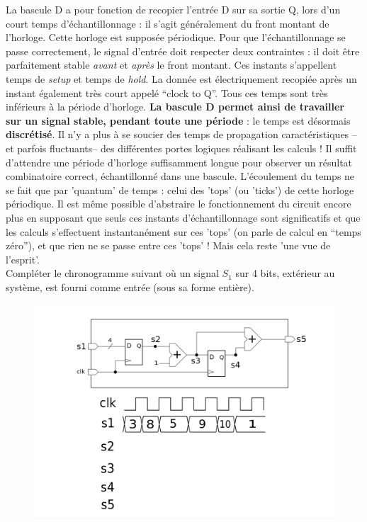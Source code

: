 \documentclass[a4paper,11pt]{article}
\begin{document}
La bascule D a pour fonction de recopier l'entrée D sur sa sortie Q, lors d'un court temps d'échantillonnage : il s'agit généralement du front montant de l'horloge. Cette horloge est supposée périodique. Pour que l'échantillonnage se passe correctement, le signal d'entrée doit respecter deux contraintes : il doit être parfaitement stable {\it avant} et {\it après} le front montant. Ces instants s'appellent temps de {\it setup} et temps de {\it hold}. La donnée est électriquement recopiée après un instant également très court appelé ``clock to Q''. Tous ces temps sont très inférieurs à la période d'horloge. {\bf La bascule D permet ainsi de travailler sur un signal stable, pendant toute une période} : le temps est désormais {\bf discrétisé}. Il n'y a plus à se soucier des temps de propagation caractéristiques -- et parfois fluctuants-- des différentes portes logiques réalisant les calculs ! Il suffit d'attendre une période d'horloge suffisamment longue pour observer un résultat combinatoire correct, échantillonné dans une bascule. L'écoulement du temps ne se fait que par 'quantum' de temps : celui des 'tops' (ou 'ticks') de cette horloge périodique. Il est même possible d'abstraire le fonctionnement du circuit encore plus en supposant que seuls ces instants d'échantillonnage sont significatifs et que les calculs s'effectuent instantanément sur ces 'tops' (on parle de calcul en ``temps zéro''), et que rien ne se passe entre ces 'tops' ! Mais cela reste 'une vue de l'esprit'.\\

Compléter le chronogramme suivant où un signal $S_1$ sur 4 bits, extérieur au système, est fourni comme entrée (sous sa forme entière).

\begin{figure}[!h]
\begin{center}
\includegraphics[scale=0.4]{./figures/dff-1.png}
\end{center}
\end{figure}
\end{document}
